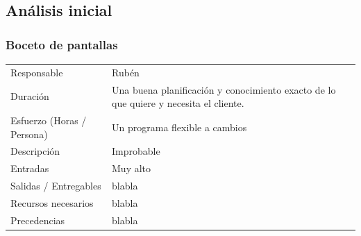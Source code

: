 \subsection{An\'{a}lisis inicial}
\subsubsection{Boceto de pantallas}
\begin{table}[H]
    \begin{center}
        \begin{tabular}{l p{8cm}}
            Responsable                           & Rub\'{e}n \\
            Duraci\'{o}n                          & Una buena planificación y conocimiento exacto de lo que quiere y necesita el cliente. \\ 
            Esfuerzo (Horas / Persona)            & Un programa flexible a cambios \\
            Descripci\'{o}n                       & Improbable \\
            Entradas                              & Muy alto\\
            Salidas / Entregables                 & blabla \\
            Recursos necesarios                   & blabla \\
            Precedencias                          & blabla \\
        \end{tabular}
    \end{center}
            
\end{table}

